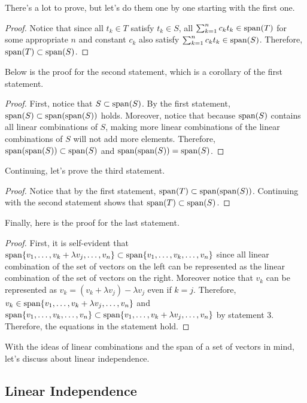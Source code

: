 \documentclass[../main.tex]{subfiles}
\begin{document}
There's a lot to prove, but let's do them one by one starting with
the first one.

\begin{proof}
Notice that since all $t_k \in T$ satisfy $t_k \in S$, all
$\sum_{k=1}^n c_k t_k \in \operatorname{span}(T)$ for some appropriate $n$ and
constant $c_k$ also satisfy $\sum_{k=1}^n c_k t_k \in \operatorname{span}(S)$.
Therefore, $\operatorname{span}(T) \subset \operatorname{span}(S)$.
\end{proof}

Below is the proof for the second statement, which is a corollary
of the first statement.

\begin{proof}
First, notice that $S \subset \operatorname{span}(S)$. By the first statement,
$\operatorname{span}(S) \subset \operatorname{span}(\operatorname{span}(S))$ holds. Moreover, notice that
because $\operatorname{span}(S)$ contains all linear combinations of $S$,
making more linear combinations of the linear combinations of $S$
will not add more elements. Therefore, $\operatorname{span}(\operatorname{span}(S)) \subset
\operatorname{span}(S)$ and $\operatorname{span}(\operatorname{span}(S)) = \operatorname{span}(S)$.
\end{proof}

Continuing, let's prove the third statement.

\begin{proof}
Notice that by the first statement, $\operatorname{span}(T) \subset
\operatorname{span}(\operatorname{span}(S))$. Continuing with the second statement shows that
$\operatorname{span}(T) \subset \operatorname{span}(S)$.
\end{proof}

Finally, here is the proof for the last statement.

\begin{proof}
First, it is self-evident that $\operatorname{span}\{ v_1, \ldots, v_k
+ \lambda v_j, \ldots, v_n \} \subset \operatorname{span}\{ v_1, \ldots,
v_k, \ldots, v_n \}$ since all linear combination of the set of
vectors on the left can be represented as the linear combination of
the set of vectors on the right. Moreover notice that $v_k$ can be
represented as $v_k = (v_k + \lambda v_j) - \lambda v_j$ even if
$k = j$. Therefore, $v_k \in \operatorname{span}\{ v_1, \ldots, v_k + \lambda v_j,
\ldots, v_n \}$ and $\operatorname{span}\{ v_1, \ldots, v_k, \ldots, v_n \} \subset
\operatorname{span}\{ v_1, \ldots, v_k + \lambda v_j, \ldots, v_n \}$ by
statement 3. Therefore, the equations in the statement hold.
\end{proof}

With the ideas of linear combinations and the span of a set of vectors
in mind, let's discuss about linear independence.

\subsection{Linear Independence}
\end{document}
